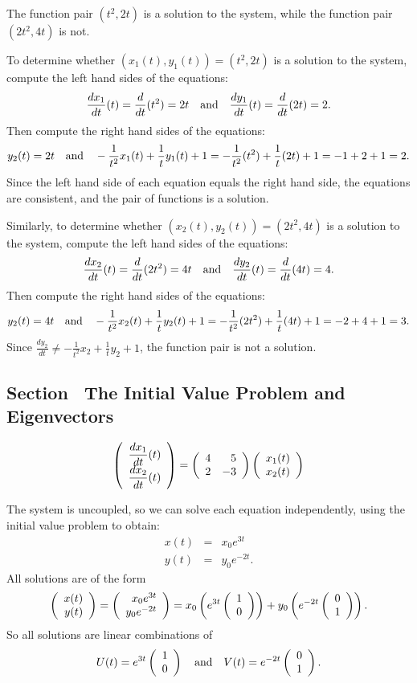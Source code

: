 \documentclass{ximera}
\begin{document}
 \ans The function pair $(t^2,2t)$ is a solution to
the system, while the function pair $(2t^2,4t)$ is not.

\soln To determine whether $(x_1(t),y_1(t)) = (t^2,2t)$ is
a solution to the system, compute the left hand sides of the equations:
\[
\frac{dx_1}{dt}(t) = \frac{d}{dt}(t^2) = 2t \quad\mbox{and}\quad
\frac{dy_1}{dt}(t) = \frac{d}{dt}(2t) = 2.
\]
Then compute the right hand sides of the equations:
\[
y_2(t) = 2t \quad\mbox{and}\quad
-\frac{1}{t^2}x_1(t) + \frac{1}{t}y_1(t) + 1 =
-\frac{1}{t^2}(t^2) + \frac{1}{t}(2t) + 1 = -1 + 2 + 1 = 2.
\]
Since the left hand side of each equation equals the right hand side, the
equations are consistent, and the pair of functions is a solution.

\para Similarly, to determine whether $(x_2(t),y_2(t)) = (2t^2,4t)$ is a
solution to the system, compute the left hand sides of the equations:
\[
\frac{dx_2}{dt}(t) = \frac{d}{dt}(2t^2) = 4t \quad\mbox{and}\quad
\frac{dy_2}{dt}(t) = \frac{d}{dt}(4t) = 4.
\]
Then compute the right hand sides of the equations:
\[
y_2(t) = 4t \quad\mbox{and}\quad
-\frac{1}{t^2}x_2(t) + \frac{1}{t}y_2(t) + 1 =
-\frac{1}{t^2}(2t^2) + \frac{1}{t}(4t) + 1 = -2 + 4 + 1 = 3.
\]
Since $\frac{dy_2}{dt} \neq -\frac{1}{t^2}x_2 + \frac{1}{t}y_2 + 1$,
the function pair is not a solution.



\subsection*{Section~\protect{\ref{S:IVP&E}} The Initial Value Problem and
Eigenvectors}

\arraystart
\[
\left(\begin{array}{r} \displaystyle\frac{dx_1}{dt}(t) \\ 
\displaystyle\frac{dx_2}{dt}(t)\end{array}\right) =
\left(\begin{array}{rr} 4 & 5 \\ 2 & -3\end{array}\right)
\left(\begin{array}{r} x_1(t) \\ x_2(t)\end{array}\right)
\]
\arrayfinish

The system is uncoupled, so we can solve each equation
independently, using the initial value problem to obtain:
\[ \begin{array}{rcl}
x(t) & = & x_0e^{3t} \\
y(t) & = & y_0e^{-2t}. \end{array} \]
All solutions are of the form
\[ \left(\begin{array}{r} x(t) \\ y(t)\end{array}\right) = \left(\begin{array}{r} x_0e^{3t} \\ y_0e^{-2t}\end{array}\right)
= x_0\left(e^{3t}\left(\begin{array}{r} 1 \\ 0\end{array}\right)\right) +
y_0\left(e^{-2t}\left(\begin{array}{r} 0 \\ 1\end{array}\right)\right). \]
So all solutions are linear combinations of
\[ 
U(t) = e^{3t}\left(\begin{array}{r} 1 \\ 0\end{array}\right) \quad\mbox{and}\quad V(t) = e^{-2t}\left(\begin{array}{r} 0 \\ 1\end{array}\right). 
\]
\end{document}
